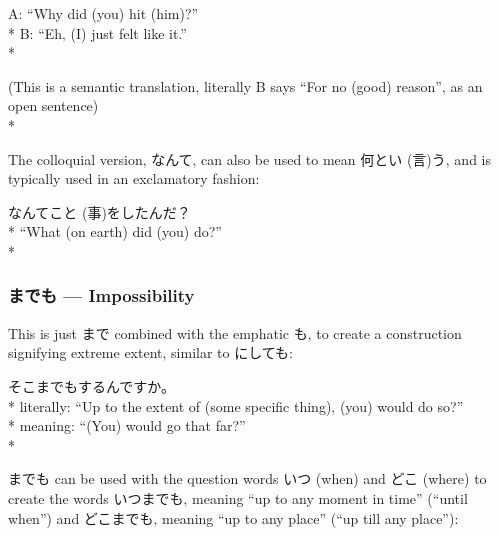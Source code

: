 \documentclass[11pt, b5paper, twoside, openright, onecolumn]{book}
\makeatletter
\newcommand*{\rubystack}[2]{{\relscale{0.5}%
  \begin{tabular}[b]{@{}c@{}}%
    {#1}\\%
   {\textscale{2}{#2}}%
  \end{tabular}}%
}
\DeclareRobustCommand*{\ruby}[2]{%
  \mbox{%
    \setlength{\parskip}{0ex}%
    \BeginAccSupp{method=pdfstringdef,ActualText={#1}}%
      \rubystack{\phantom{#2}}{#1}%
      \llap{%
        \rubystack{#2}{\phantom{#1}}%
      }%
    \EndAccSupp{}%
  }%
}
\renewcommand*{\ruby}[2]{#2 (#1)}%
\newenvironment{exampleblock}{
\setlength{\parindent}{0.6in}
\begin{minipage}[t]{\dimexpr\textwidth-\parindent}}
{\end{minipage}}
\makeatother
\begin{document}
\begin{exampleblock}
A: “Why did (you) hit (him)?” \\* 
B: “Eh‚ (I) just felt like it.” \\* 
\end{exampleblock}
\vspace{0.2cm}

\begin{exampleblock}
(This is a semantic translation‚ literally B says “For no (good) reason”‚ as an open sentence) \\* 
\end{exampleblock}
\vspace{0.2cm}

The colloquial version‚ なんて‚ can also be used to mean 何と\ruby{言}{い}う‚ and is typically used in an exclamatory fashion:

\vspace{0.4cm}
\begin{exampleblock}
なんて\ruby{事}{こと}をしたんだ？ \\* 
“What (on earth) did (you) do?” \\* 
\end{exampleblock}
\subsubsection{までも — Impossibility}


This is just まで combined with the emphatic も‚ to create a construction signifying extreme extent‚ similar to にしても:

\vspace{0.4cm}
\begin{exampleblock}
そこまでもするんですか。 \\* 
literally: “Up to the extent of (some specific thing)‚ (you) would do so?” \\* 
meaning: “(You) would go that far?” \\* 
\end{exampleblock}
\vspace{0.2cm}

までも can be used with the question words いつ (when) and どこ (where) to create the words いつまでも‚ meaning “up to any moment in time” (“until when”) and どこまでも‚ meaning “up to any place” (“up till any place”):
\end{document}
